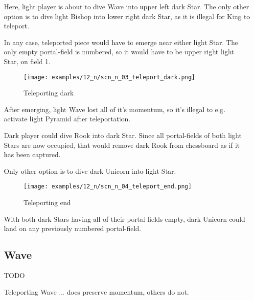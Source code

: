 Here, light player is about to dive Wave into upper left dark Star. The only
other option is to dive light Bishop into lower right dark Star, as it is
illegal for King to teleport.

In any case, teleported piece would have to emerge near either light Star.
The only empty portal-field is numbered, so it would have to be upper right
light Star, on field 1.

\clearpage %

\noindent
\begin{figure}[!h]
\texttt{[image: examples/12\_n/scn\_n\_03\_teleport\_dark.png]}
\caption{Teleporting dark}
\label{fig:scn_n_03_teleport_dark}
\end{figure}

After emerging, light Wave lost all of it's momentum, so it's illegal to
e.g. activate light Pyramid after teleportation.

Dark player could dive Rook into dark Star. Since all portal-fields of both
light Stars are now occupied, that would remove dark Rook from chessboard as
if it has been captured.

Only other option is to dive dark Unicorn into light Star.

\clearpage %

\noindent
\begin{figure}[!h]
\texttt{[image: examples/12\_n/scn\_n\_04\_teleport\_end.png]}
\caption{Teleporting end}
\label{fig:scn_n_04_teleport_end}
\end{figure}

With both dark Stars having all of their portal-fields empty, dark Unicorn could
land on any previously numbered portal-field.

\clearpage %

\subsection*{Wave}

\huge{TODO}
\normalsize{}

Teleporting Wave ... does preserve momentum, others do not.

